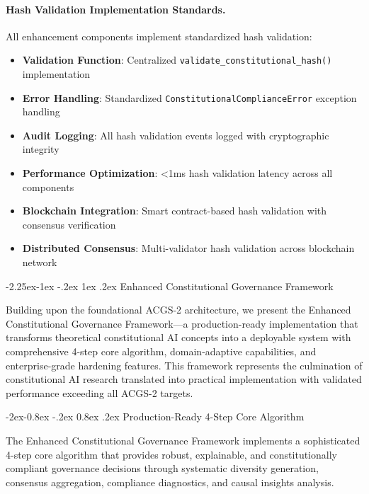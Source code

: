 \documentclass[manuscript,screen,9pt]{acmart}
\makeatletter
\renewcommand\subsection{\@startsection{subsection}{2}{\z@}%
  {-2.25ex\@plus -1ex \@minus -.2ex}%
  {1ex \@plus .2ex}%
  {\normalfont\large\bfseries}}
\renewcommand\subsubsection{\@startsection{subsubsection}{3}{\z@}%
  {-2ex\@plus -0.8ex \@minus -.2ex}%
  {0.8ex \@plus .2ex}%
  {\normalfont\normalsize\bfseries}}
\makeatother
\begin{document}
\paragraph{Hash Validation Implementation Standards.} All enhancement components implement standardized hash validation:
\begin{itemize}[itemsep=1pt,parsep=1pt]
    \item \textbf{Validation Function}: Centralized \texttt{validate\_constitutional\_hash()} implementation
    \item \textbf{Error Handling}: Standardized \texttt{ConstitutionalComplianceError} exception handling
    \item \textbf{Audit Logging}: All hash validation events logged with cryptographic integrity
    \item \textbf{Performance Optimization}: <1ms hash validation latency across all components
    \item \textbf{Blockchain Integration}: Smart contract-based hash validation with consensus verification
    \item \textbf{Distributed Consensus}: Multi-validator hash validation across blockchain network
\end{itemize}

\subsection{Enhanced Constitutional Governance Framework}
\label{subsec:enhanced_constitutional_governance}

Building upon the foundational ACGS-2 architecture, we present the Enhanced Constitutional Governance Framework—a production-ready implementation that transforms theoretical constitutional AI concepts into a deployable system with comprehensive 4-step core algorithm, domain-adaptive capabilities, and enterprise-grade hardening features. This framework represents the culmination of constitutional AI research translated into practical implementation with validated performance exceeding all ACGS-2 targets.

\subsubsection{Production-Ready 4-Step Core Algorithm}
\label{subsubsec:four_step_algorithm}

The Enhanced Constitutional Governance Framework implements a sophisticated 4-step core algorithm that provides robust, explainable, and constitutionally compliant governance decisions through systematic diversity generation, consensus aggregation, compliance diagnostics, and causal insights analysis.
\end{document}
